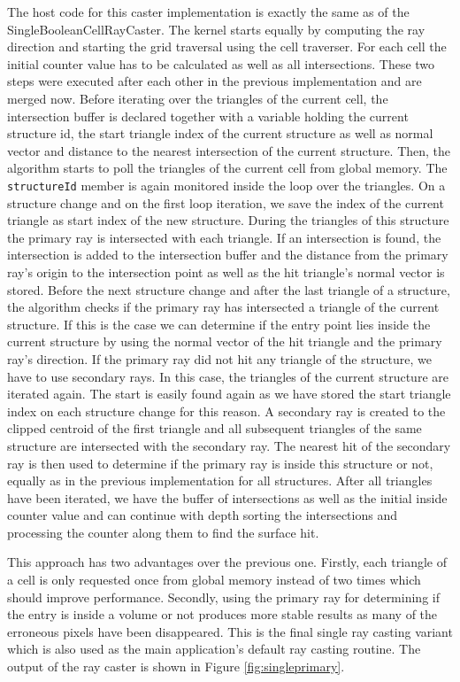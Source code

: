 The host code for this caster implementation is exactly the same as of the SingleBooleanCellRayCaster. The kernel starts equally by computing the ray direction and starting the grid traversal using the cell traverser. For each cell the initial counter value has to be calculated as well as all intersections. These two steps were executed after each other in the previous implementation and are merged now. Before iterating over the triangles of the current cell, the intersection buffer is declared together with a variable holding the current structure id, the start triangle index of the current structure as well as normal vector and distance to the nearest intersection of the current structure. Then, the algorithm starts to poll the triangles of the current cell from global memory. The \lstinline!structureId! member is again monitored inside the loop over the triangles. On a structure change and on the first loop iteration, we save the index of the current triangle as start index of the new structure. During the triangles of this structure the primary ray is intersected with each triangle. If an intersection is found, the intersection is added to the intersection buffer and the distance from the primary ray's origin to the intersection point as well as the hit triangle's normal vector is stored. Before the next structure change and after the last triangle of a structure, the algorithm checks if the primary ray has intersected a triangle of the current structure. If this is the case we can determine if the entry point lies inside the current structure by using the normal vector of the hit triangle and the primary ray's direction. If the primary ray did not hit any triangle of the structure, we have to use secondary rays. In this case, the triangles of the current structure are iterated again. The start is easily found again as we have stored the start triangle index on each structure change for this reason. A secondary ray is created to the clipped centroid of the first triangle and all subsequent triangles of the same structure are intersected with the secondary ray. The nearest hit of the secondary ray is then used to determine if the primary ray is inside this structure or not, equally as in the previous implementation for all structures. After all triangles have been iterated, we have the buffer of intersections as well as the initial inside counter value and can continue with depth sorting the intersections and processing the counter along them to find the surface hit.

This approach has two advantages over the previous one. Firstly, each triangle of a cell is only requested once from global memory instead of two times which should improve performance. Secondly, using the primary ray for determining if the entry is inside a volume or not produces more stable results as many of the erroneous pixels have been disappeared. This is the final single ray casting variant which is also used as the main application's default ray casting routine. The output of the ray caster is shown in Figure \ref{fig:singleprimary}.

